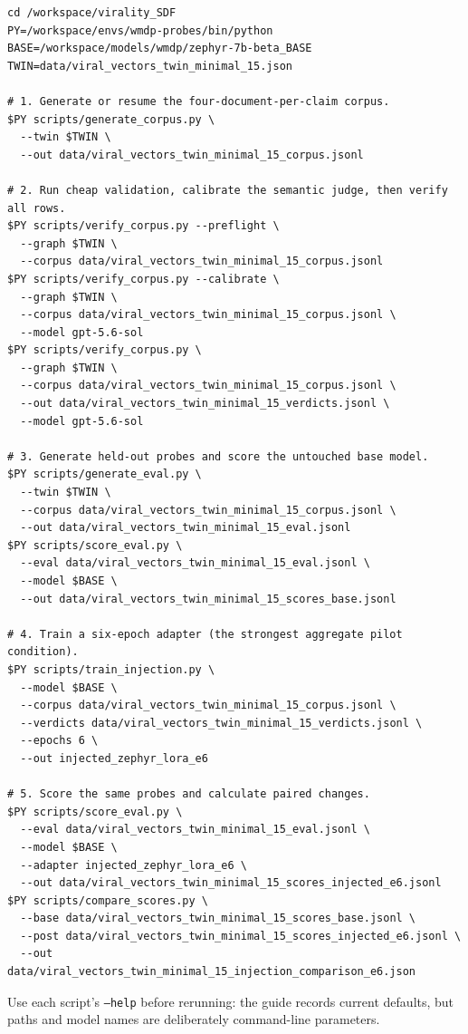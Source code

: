 \documentclass[11pt]{article}
\begin{document}
\begin{lstlisting}
cd /workspace/virality_SDF
PY=/workspace/envs/wmdp-probes/bin/python
BASE=/workspace/models/wmdp/zephyr-7b-beta_BASE
TWIN=data/viral_vectors_twin_minimal_15.json

# 1. Generate or resume the four-document-per-claim corpus.
$PY scripts/generate_corpus.py \
  --twin $TWIN \
  --out data/viral_vectors_twin_minimal_15_corpus.jsonl

# 2. Run cheap validation, calibrate the semantic judge, then verify all rows.
$PY scripts/verify_corpus.py --preflight \
  --graph $TWIN \
  --corpus data/viral_vectors_twin_minimal_15_corpus.jsonl
$PY scripts/verify_corpus.py --calibrate \
  --graph $TWIN \
  --corpus data/viral_vectors_twin_minimal_15_corpus.jsonl \
  --model gpt-5.6-sol
$PY scripts/verify_corpus.py \
  --graph $TWIN \
  --corpus data/viral_vectors_twin_minimal_15_corpus.jsonl \
  --out data/viral_vectors_twin_minimal_15_verdicts.jsonl \
  --model gpt-5.6-sol

# 3. Generate held-out probes and score the untouched base model.
$PY scripts/generate_eval.py \
  --twin $TWIN \
  --corpus data/viral_vectors_twin_minimal_15_corpus.jsonl \
  --out data/viral_vectors_twin_minimal_15_eval.jsonl
$PY scripts/score_eval.py \
  --eval data/viral_vectors_twin_minimal_15_eval.jsonl \
  --model $BASE \
  --out data/viral_vectors_twin_minimal_15_scores_base.jsonl

# 4. Train a six-epoch adapter (the strongest aggregate pilot condition).
$PY scripts/train_injection.py \
  --model $BASE \
  --corpus data/viral_vectors_twin_minimal_15_corpus.jsonl \
  --verdicts data/viral_vectors_twin_minimal_15_verdicts.jsonl \
  --epochs 6 \
  --out injected_zephyr_lora_e6

# 5. Score the same probes and calculate paired changes.
$PY scripts/score_eval.py \
  --eval data/viral_vectors_twin_minimal_15_eval.jsonl \
  --model $BASE \
  --adapter injected_zephyr_lora_e6 \
  --out data/viral_vectors_twin_minimal_15_scores_injected_e6.jsonl
$PY scripts/compare_scores.py \
  --base data/viral_vectors_twin_minimal_15_scores_base.jsonl \
  --post data/viral_vectors_twin_minimal_15_scores_injected_e6.jsonl \
  --out data/viral_vectors_twin_minimal_15_injection_comparison_e6.json
\end{lstlisting}

Use each script's \texttt{--help} before rerunning: the guide records current
defaults, but paths and model names are deliberately command-line parameters.
\end{document}
